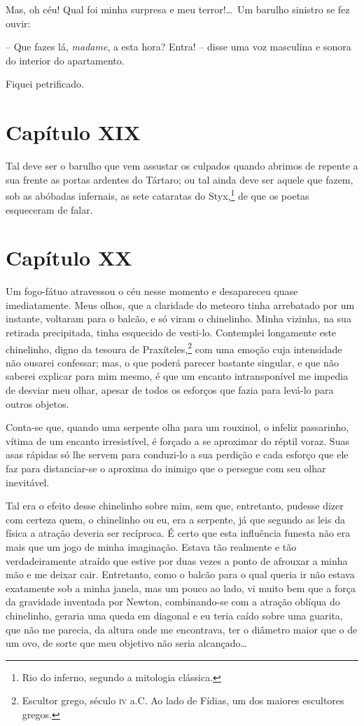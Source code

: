  Mas, oh céu! Qual foi minha surpresa e meu terror!\ldots\ Um barulho
sinistro se fez ouvir:

 -- Que fazes lá, \textit{madame}, a esta hora? Entra! -- disse uma voz
masculina e sonora do interior do apartamento.

 Fiquei petrificado.

\section{Capítulo XIX}

 Tal deve ser o barulho que vem assustar os culpados quando abrimos de
repente a sua frente as portas ardentes do Tártaro; ou tal ainda deve
ser aquele que fazem, sob as abóbadas infernais, as sete cataratas do
Styx,\footnote{ Rio do inferno, segundo a mitologia clássica.} de
que os poetas esqueceram de falar.

\section{Capítulo XX}

 Um fogo-fátuo atravessou o céu nesse momento e desapareceu quase
imediatamente. Meus olhos, que a claridade do meteoro tinha arrebatado
por um instante, voltaram para o balcão, e só viram o chinelinho. Minha
vizinha, na sua retirada precipitada, tinha esquecido de vesti-lo.
Contemplei longamente este chinelinho, digno da tesoura de
Praxíteles,\footnote{ Escultor grego, século \textsc{iv} a.C. Ao lado de Fídias,
um dos maiores escultores gregos.} com uma emoção cuja
intensidade não ousarei confessar; mas, o que poderá parecer bastante
singular, e que não saberei explicar para mim mesmo, é que um encanto
intransponível me impedia de desviar meu olhar, apesar de todos os
esforços que fazia para levá-lo para outros objetos. 

 Conta-se que, quando uma serpente olha para um rouxinol, o infeliz
passarinho, vítima de um encanto irresistível, é forçado a se aproximar
do réptil voraz. Suas asas rápidas só lhe servem para conduzi-lo a sua
perdição e cada esforço que ele faz para distanciar-se o aproxima do
inimigo que o persegue com seu olhar inevitável. 

 Tal era o efeito desse chinelinho sobre mim, sem que, entretanto,
pudesse dizer com certeza quem, o chinelinho ou eu, era a serpente, já
que segundo as leis da física a atração deveria ser recíproca. É certo
que esta influência funesta não era mais que um jogo de minha
imaginação. Estava tão realmente e tão verdadeiramente atraído que
estive por duas vezes a ponto de afrouxar a minha mão e me deixar cair.
Entretanto, como o balcão para o qual queria ir não estava exatamente
sob a minha janela, mas um pouco ao lado, vi muito bem que a força da
gravidade inventada por Newton, combinando-se com a atração oblíqua do
chinelinho, geraria uma queda em diagonal e eu teria caído sobre uma
guarita, que não me parecia, da altura onde me encontrava, ter o
diâmetro maior que o de um ovo, de sorte que meu objetivo não seria
alcançado\ldots

